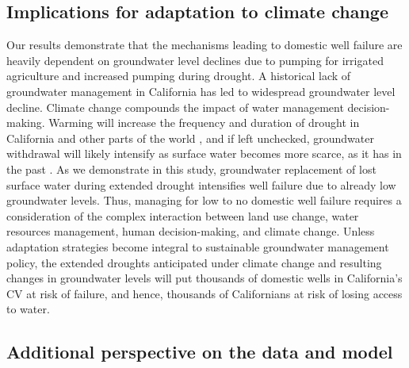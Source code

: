 \subsection{Implications for adaptation to climate change}

Our results demonstrate that the mechanisms leading to domestic well failure are heavily dependent on groundwater level declines due to pumping for irrigated agriculture and increased pumping during drought. A historical lack of groundwater management in California \citep{Hanak2011} has led to widespread groundwater level decline. Climate change compounds the impact of water management decision-making. Warming will increase the frequency and duration of drought in California and other parts of the world \citep{Diffenbaugh2015, Cook2015, Swain2018, Rhoades2018, VanLoon2016}, and if left unchecked, groundwater withdrawal will likely intensify as surface water becomes more scarce, as it has in the past \citep{Hanak2011}. As we demonstrate in this study, groundwater replacement of lost surface water during extended drought intensifies well failure due to already low groundwater levels. Thus, managing for low to no domestic well failure requires a consideration of the complex interaction between land use change, water resources management, human decision-making, and climate change. Unless adaptation strategies become integral to sustainable groundwater management policy, the extended droughts anticipated under climate change and resulting changes in groundwater levels will put thousands of domestic wells in California's CV at risk of failure, and hence, thousands of Californians at risk of losing access to water.  


\subsection{Additional perspective on the data and model}


